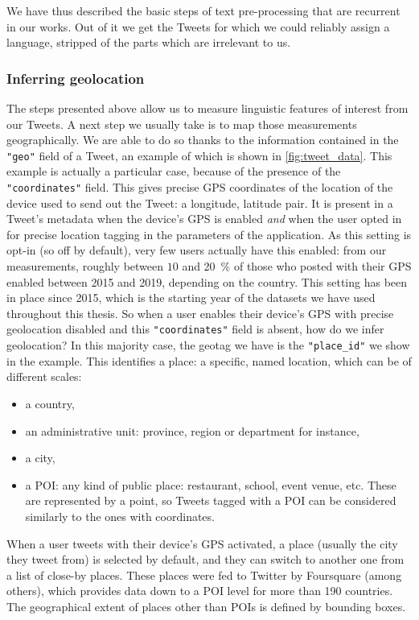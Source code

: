 \documentclass[../thesis.tex]{subfiles}
\begin{document}
We have thus described the basic steps of text pre-processing that are recurrent in our
works. Out of it we get the Tweets for which we could reliably assign a language,
stripped of the parts which are irrelevant to us.


\subsubsection{Inferring geolocation}
\label{sec:method_geoloc}
The steps presented above allow us to measure linguistic features of interest from our
Tweets. A next step we usually take is to map those measurements geographically. We are
able to do so thanks to the information contained in the \texttt{"geo"} field of a
Tweet, an example of which is shown in \cref{fig:tweet_data}. This example is actually a
particular case, because of the presence of the \texttt{"coordinates"} field. This gives
precise GPS coordinates of the location of the device used to send out the Tweet: a
longitude, latitude pair. It is present in a Tweet's metadata when the device's GPS is
enabled \emph{and} when the user opted in for precise location tagging in the parameters
of the application. As this setting is opt-in (so off by default), very few users
actually have this enabled: from our measurements, roughly between $10$ and
\SI{20}{\percent} of those who posted with their GPS enabled between 2015 and 2019,
depending on the country. This setting has been in place since 2015, which is the
starting year of the datasets we have used throughout this thesis. So when a user
enables their device's GPS with precise geolocation disabled and this
\texttt{"coordinates"} field is absent, how do we infer geolocation? In this majority
case, the geotag we have is the \texttt{"place\_id"} we show in the example. This
identifies a place: a specific, named location, which can be of different scales:
\begin{itemize}
    \item a country,
    \item an administrative unit: province, region or department for instance,
    \item a city,
    \item a \ac{POI}: any kind of public place: restaurant, school, event venue, etc.
    These are represented by a point, so Tweets tagged with a \ac{POI} can be considered
    similarly to the ones with coordinates.
\end{itemize}
When a user tweets with their device's GPS activated, a place (usually the city they
tweet from) is selected by default, and they can switch to another one from a list of
close-by places. These places were fed to Twitter by Foursquare
\cite{FoursquarePlaces2019} (among others), which provides data down to a \ac{POI} level
for more than 190 countries. The geographical extent of places other than \acp{POI} is
defined by bounding boxes.
\end{document}
